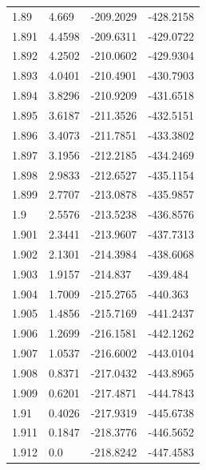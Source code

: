 \begin{tabular}{llll}
1.89 & 4.669 & -209.2029 & -428.2158 \\
1.891 & 4.4598 & -209.6311 & -429.0722 \\
1.892 & 4.2502 & -210.0602 & -429.9304 \\
1.893 & 4.0401 & -210.4901 & -430.7903 \\
1.894 & 3.8296 & -210.9209 & -431.6518 \\
1.895 & 3.6187 & -211.3526 & -432.5151 \\
1.896 & 3.4073 & -211.7851 & -433.3802 \\
1.897 & 3.1956 & -212.2185 & -434.2469 \\
1.898 & 2.9833 & -212.6527 & -435.1154 \\
1.899 & 2.7707 & -213.0878 & -435.9857 \\
1.9 & 2.5576 & -213.5238 & -436.8576 \\
1.901 & 2.3441 & -213.9607 & -437.7313 \\
1.902 & 2.1301 & -214.3984 & -438.6068 \\
1.903 & 1.9157 & -214.837 & -439.484 \\
1.904 & 1.7009 & -215.2765 & -440.363 \\
1.905 & 1.4856 & -215.7169 & -441.2437 \\
1.906 & 1.2699 & -216.1581 & -442.1262 \\
1.907 & 1.0537 & -216.6002 & -443.0104 \\
1.908 & 0.8371 & -217.0432 & -443.8965 \\
1.909 & 0.6201 & -217.4871 & -444.7843 \\
1.91 & 0.4026 & -217.9319 & -445.6738 \\
1.911 & 0.1847 & -218.3776 & -446.5652 \\
1.912 & 0.0 & -218.8242 & -447.4583 \\
\bottomrule
\end{tabular}

